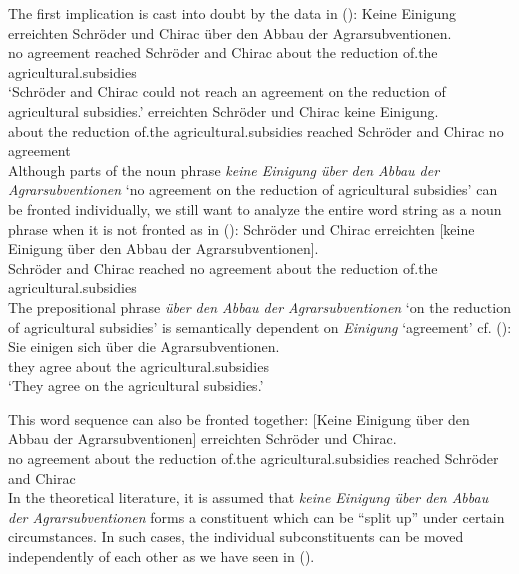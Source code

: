 {The first implication is cast into doubt by the data in ():
\eal
\ex
\gll Keine Einigung erreichten Schröder und Chirac über den Abbau der Agrarsubventionen.\footnotemark\\
     no agreement reached Schröder and Chirac about the reduction of.the agricultural.subsidies\\
\glt `Schröder and Chirac could not reach an agreement on the reduction of agricultural subsidies.'
\ex 
{}     erreichten Schröder und Chirac keine Einigung.\\
     \spacebr{}about the reduction of.the agricultural.subsidies reached    Schröder and Chirac no agreement\\
\zl
Although parts of the noun phrase \emph{keine Einigung über den Abbau der Agrarsubventionen} `no agreement on the reduction
of agricultural subsidies' can be fronted individually, we still want to analyze the entire word string as a noun phrase when it
is not fronted as in ():
\ea
\gll Schröder und Chirac erreichten [keine Einigung über den Abbau der Agrarsubventionen].\\
     Schröder and Chirac reached    \spacebr{}no agreement about the reduction of.the agricultural.subsidies\\
\z
The prepositional phrase \emph{über den Abbau der Agrarsubventionen} `on the reduction of agricultural subsidies' is semantically
dependent on \emph{Einigung} `agreement' cf. ():
\ea
\gll Sie einigen sich über die Agrarsubventionen.\\
     they agree  about the agricultural.subsidies\\
\glt `They agree on the agricultural subsidies.'
\z


This word sequence can also be fronted together:
\ea
\gll {}[Keine Einigung über den Abbau der Agrarsubventionen] erreichten Schröder und Chirac.\\
     \spacebr{}no agreement about the reduction of.the agricultural.subsidies  reached Schröder and Chirac\\
\z
In the theoretical literature, it is assumed that \emph{keine Einigung über den Abbau
  der Agrarsubventionen} forms a constituent which can be ``split up'' under certain circumstances.
In such cases, the individual subconstituents can be moved independently of each other \citep{deKuthy2002a} as we have seen in (). 

}

